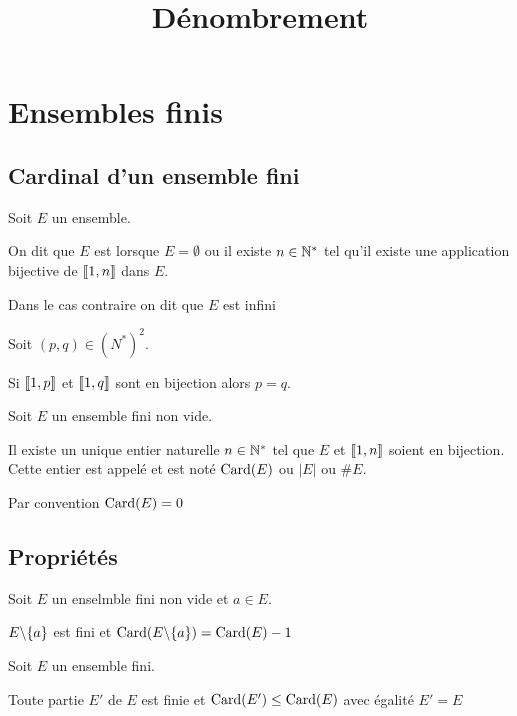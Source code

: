 

\title{Dénombrement}



\section{Ensembles finis}

\subsection{Cardinal d'un ensemble fini}

\begin{dfn}
  Soit $E$ un ensemble.

  On dit que $E$ est  lorsque
  $E = \emptyset$ ou il existe $n \in \mathbb{N}^*$ tel qu'il
  existe une application bijective de $\llbracket 1, n \rrbracket$ dans $E$.

  Dans le cas contraire on dit que $E$ est infini
\end{dfn}

\begin{prp}
  Soit $(p, q) \in (N^*)^2$.

  Si $\llbracket 1, p \rrbracket$ et $\llbracket 1, q \rrbracket$ sont en bijection alors
  $p = q$.
\end{prp}

\begin{dfn}
  Soit $E$ un ensemble fini non vide.

  Il existe un unique entier naturelle $n \in \mathbb{N}^*$
  tel que $E$ et $\llbracket 1, n \rrbracket$ soient en bijection.
  Cette entier est appelé  et
  est noté $\operatorname{\mathrm{Card}}(E)$ ou $|E|$ ou $\#E$.

  Par convention $\operatorname{\mathrm{Card}}(E) = 0$
\end{dfn}

\subsection{Propriétés}

\begin{prp}
  Soit $E$ un enselmble fini non vide et $a \in E$.

  $E \backslash \{a\}$ est fini et $\operatorname{\mathrm{Card}}(E \backslash \{a\}) = \operatorname{\mathrm{Card}}(E) - 1$
\end{prp}

\begin{prp}
  Soit $E$ un ensemble fini.

  Toute partie $E'$ de $E$ est finie et
  $\operatorname{\mathrm{Card}}(E') \leq \operatorname{\mathrm{Card}}(E)$ avec égalité \ssi
  $E' = E$
\end{prp}

